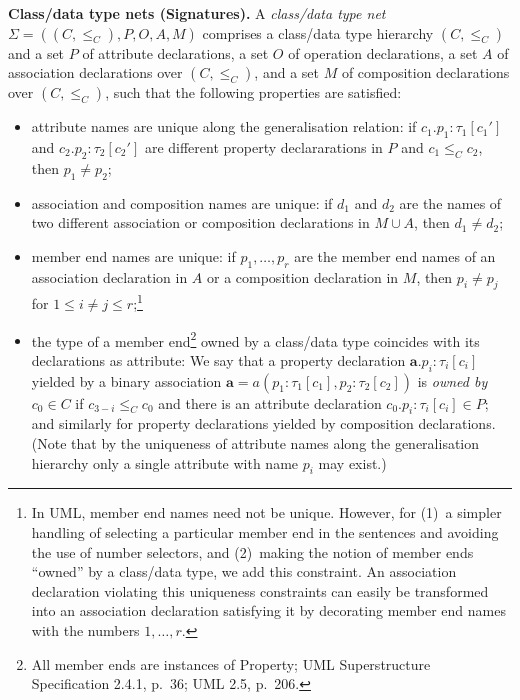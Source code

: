 \documentclass[10pt,fleqn,%
\ifpretendfinal
final%
\else
draft%
\fi,
]{scrreprt}
\newcommand{\uml}[1]{\textsf{#1}}
\begin{document}
\medskip\noindent\textbf{Class/data type nets (Signatures).}
A \emph{class/data type net} $\Sigma = ((C, {\leq_C}), P, O, A, M)$
comprises a class/data type hierarchy $(C, {\leq_C})$ and a set $P$ of
attribute declarations, a set $O$ of operation declarations,
 a set $A$ of association declarations over
$(C, {\leq_C})$, and a set $M$ of composition declarations over $(C, {\leq_C})$, such that
the following properties are satisfied:
%
\begin{itemize}[label={--}, leftmargin=*]
  \item attribute names are unique along the generalisation relation: if
$c_1.p_1 : \tau_1[c_1']$ and $c_2.p_2 : \tau_2[c_2']$ are different
property declararations in $P$ and $c_1 \leq_C c_2$, then $p_1 \neq
p_2$;

  \item association and composition names are unique: if $d_1$ and
$d_2$ are the names of two different association or composition
declarations in $M \cup A$, then $d_1 \neq d_2$;

  \item member end names are unique: if $p_1, \ldots, p_r$ are the
member end names of an association declaration in $A$ or a composition
declaration in $M$, then $p_i \neq p_j$ for
$1 \leq i \neq j \leq r$;\footnote{In UML, member end names need not be
  unique.  However, for (1)~a simpler handling of selecting a particular
  member end in the sentences and avoiding the use of number selectors,
  and (2)~making the notion of member ends ``owned'' by a class/data
  type, we add this constraint. An association declaration violating this
  uniqueness constraints can easily be transformed into an association 
  declaration satisfying it by decorating member end names with the
  numbers $1,\ldots,r$.}

  \item the type of a member end\footnote{All member ends are instances
  of \uml{Property}; UML Superstructure Specification 2.4.1, p.~36; UML
  2.5, p.~206.}
owned by a class/data type coincides with its declarations as attribute:
We say that a property declaration $\mathbf{a}.p_i : \tau_i[c_i]$
yielded by a binary association
$\mathbf{a} = a(p_1 : \tau_1[c_1], p_2 : \tau_2[c_2])$ is \emph{owned
  by} $c_0 \in C$ if $c_{3-i} \leq_C c_0$ and there is an attribute
declaration $c_0.p_i : \tau_i[c_i] \in P$; and similarly for property
declarations yielded by composition declarations.  (Note that by the
uniqueness of attribute names along the generalisation hierarchy only a
single attribute with name $p_i$ may exist.)
\end{itemize}
\end{document}
